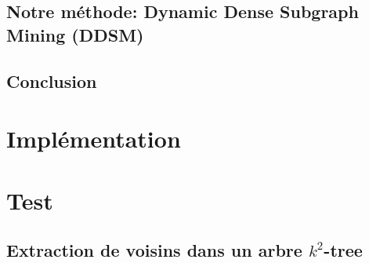 \documentclass[a4paper,oneside,12pt]{report}
\theoremstyle{definition}
\begin{document}
		
		
	\section{Notre méthode: Dynamic Dense Subgraph Mining (DDSM)}
		
	
	\section{Conclusion}
	
\chapter{Implémentation}
\chapter{Test}








\pagestyle{plain}
\newpage

\begin{appendix}

\chapter{Extraction de voisins dans un arbre $k^2$-tree}
    \label{k2_annexe}








\end{appendix}



\newpage






\end{document}
